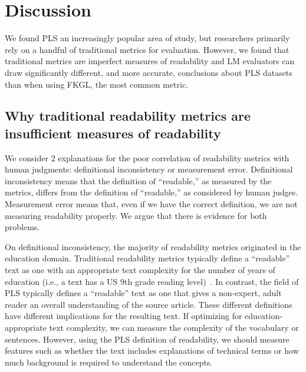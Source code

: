 \section{Discussion}\label{sec:discussion}

We found PLS an increasingly popular area of study, but researchers primarily rely on a handful of traditional metrics for evaluation. However, we found that traditional metrics are imperfect measures of readability and LM evaluators can draw significantly different, and more accurate, conclusions about PLS datasets than when using FKGL, the most common metric.



\subsection{Why traditional readability metrics are insufficient measures of readability}\label{subsec:discussion-inconsistency}
We consider 2 explanations for the poor correlation of readability metrics with human judgments: definitional inconsistency or measurement error. Definitional inconsistency means that the definition of ``readable,'' as measured by the metrics, differs from the definition of ``readable,'' as considered by human judges. Measurement error means that, even if we have the correct definition, we are not measuring readability properly.
We argue that there is evidence for both problems.

On definitional inconsistency, the majority of readability metrics originated in the education domain. Traditional readability metrics typically define a ``readable'' text as one with an appropriate text complexity for the number of years of education (i.e., a text has a US 9th grade reading level)~\parencite{Gunning1968TheTO,Coleman1975ACR,flesch1952simplification}. In contrast, the field of PLS typically defines a ``readable'' text as one that gives a non-expert, adult reader an overall understanding of the source article. These different definitions have different implications for the resulting text. If optimizing for education-appropriate text complexity, we can measure the complexity of the vocabulary or sentences. However, using the PLS definition of readability, we should measure features such as whether the text includes explanations of technical terms or how much background is required to understand the concepts.

